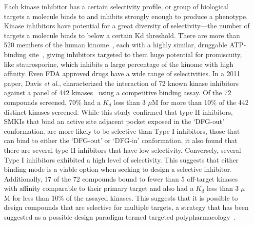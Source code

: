 \documentclass[phd,tocprelim]{cornell}
\begin{document}
Each kinase inhibitor has a certain selectivity profile, or group of biological targets a molecule binds to and inhibits strongly enough to produce a phenotype. Kinase inhibitors have potential for a great diversity of selectivity---the number of targets a molecule binds to below a certain Kd threshold. There are more than 520 members of the human kinome~\citep{Manning2002-cw}, each with a highly similar, druggable ATP-binding site~\citep{Cowan-Jacob2007-rn,Seeliger2007-jn,Huse2002-ml,Harrison2003-ct,Nagar:2003tu}, giving inhibitors targeted to them huge potential for promiscuity, like staurosporine, which inhibits a large percentage of the kinome with high affinity. Even FDA approved drugs have a wide range of selectivities. In a 2011 paper, Davis \emph{et al.}, characterized the interaction of 72 known kinase inhibitors against a panel of 442 kinases~\cite{Davis:Nat.Biotechnol.:2011} using a competitive binding assay. Of the 72 compounds screened, 70\% had a $K_d$ less than 3 $\mu$M for more than 10\% of the 442 distinct kinases screened. While this study confirmed that type II inhibitors, SMKIs that bind an active site adjacent pocket exposed in the ‘DFG-out’ conformation, are more likely to be selective than Type I inhibitors, those that can bind to either the ‘DFG-out’ or ‘DFG-in’ conformation, it also found that there are several type II inhibitors that have low selectivity. Conversely, several Type I inhibitors exhibited a high level of selectivity. This suggests that either binding mode is a viable option when seeking to design a selective inhibitor. Additionally, 17 of the 72 compounds bound to fewer than 5 off-target kinases with affinity comparable to their primary target and also had a $K_d$ less than 3 $\mu$M for less than 10\% of the assayed kinases. This suggests that it is possible to design compounds that are selective for multiple targets, a strategy that has been suggested as a possible design paradigm termed targeted polypharmacology~\citep{Knight:Nat.Rev.Cancer:2010,Apsel2008-it,Hopkins2006-qu,Hopkins2008-ij}. 
\end{document}
